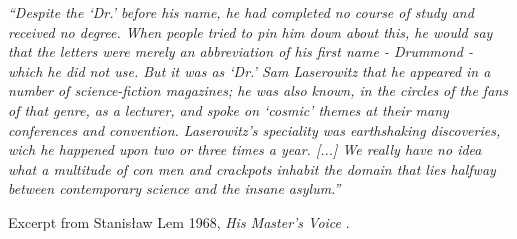 \begin{titlepage}
\end{titlepage}

\clearpage


\vspace*{\fill}


\noindent \textit{``Despite the `Dr.' before his name, he had completed no course of study and received no degree. When people tried to pin him down about this, he would say that the letters were merely an abbreviation of his first name - Drummond - which he did not use. But it was as `Dr.' Sam Laserowitz that he appeared in a number of science-fiction magazines; he was also known, in the circles of the fans of that genre, as a lecturer, and spoke on `cosmic' themes at their many conferences and convention. Laserowitz's speciality was earthshaking discoveries, wich he happened upon two or three times a year. [...] We really have no idea what a multitude of con men and crackpots inhabit the domain that lies halfway between contemporary science and the insane asylum.''}
\vspace{\baselineskip}

\noindent Excerpt from Stanis\l aw Lem 1968, \textit{His Master's Voice} \citep[p.~38]{Lem1984}.


\newpage


